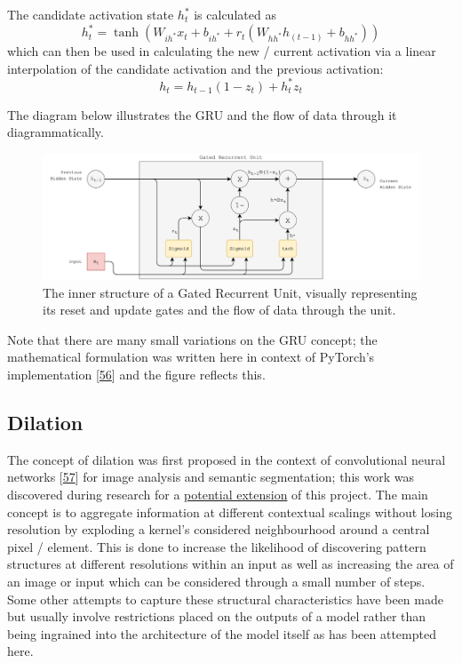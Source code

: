 \documentclass[12pt,]{article}
\begin{document}
The candidate activation state \(h_t^*\) is calculated as
\[h_t^* = \tanh(W_{ih^*} x_t + b_{ih^*} + r_t (W_{hh^*} h_{(t-1)} + b_{hh^*}))\]
which can then be used in calculating the new / current activation via a
linear interpolation of the candidate activation and the previous
activation: \[h_t = h_{t-1} (1 - z_t) + h_t^* z_t\]

The diagram below illustrates the GRU and the flow of data through it
diagrammatically.

\begin{figure}
\centering
\includegraphics{Images/gru.png}
\caption{The inner structure of a Gated Recurrent Unit, visually
representing its reset and update gates and the flow of data through the
unit.}
\end{figure}

Note that there are many small variations on the GRU concept; the
mathematical formulation was written here in context of PyTorch's
implementation {[}\protect\hyperlink{ref-pytorchgru}{56}{]} and the
figure reflects this.

\hypertarget{dilation}{%
\subsection{Dilation}\label{dilation}}

The concept of dilation was first proposed in the context of
convolutional neural networks
{[}\protect\hyperlink{ref-yu2015multi}{57}{]} for image analysis and
semantic segmentation; this work was discovered during research for a
\protect\hyperlink{sentimentalinputfromimages}{potential extension} of
this project. The main concept is to aggregate information at different
contextual scalings without losing resolution by exploding a kernel's
considered neighbourhood around a central pixel / element. This is done
to increase the likelihood of discovering pattern structures at
different resolutions within an input as well as increasing the area of
an image or input which can be considered through a small number of
steps. Some other attempts to capture these structural characteristics
have been made but usually involve restrictions placed on the outputs of
a model rather than being ingrained into the architecture of the model
itself as has been attempted here.
\end{document}
